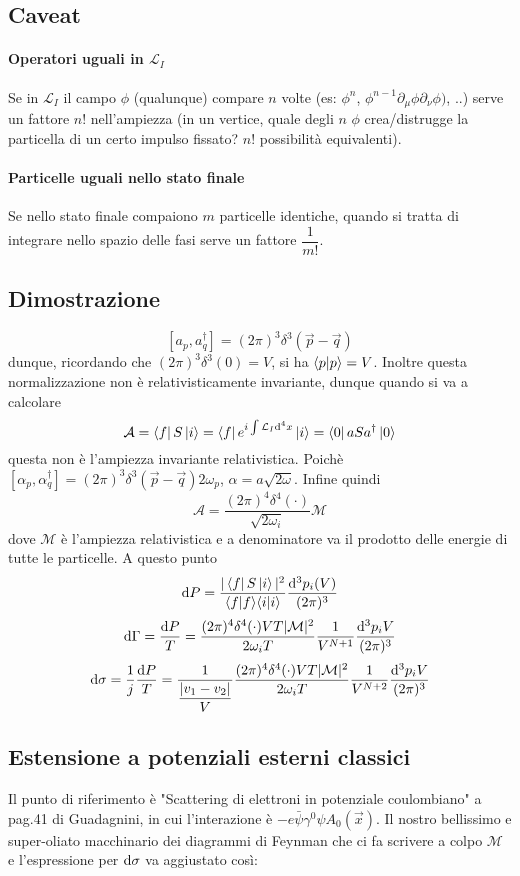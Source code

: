 \documentclass[12pt,a4paper]{article}
\begin{document}
	\subsection{Caveat}
	\paragraph{Operatori uguali in $\mathcal{L}_I$} Se in $\mathcal{L}_I$ il campo $\phi$ (qualunque) compare $n$ volte (es: $\phi^n$, $\phi^{n-1} \partial_\mu \phi \partial_\nu \phi)$, ..) serve un fattore $n!$ nell'ampiezza (in un vertice, quale degli $n$ $\phi$ crea/distrugge la particella di un certo impulso fissato? $n!$ possibilità equivalenti).
	
	\paragraph{Particelle uguali nello stato finale} Se nello stato finale compaiono $m$ particelle identiche, quando si tratta di integrare nello spazio delle fasi serve un fattore $\dfrac{1}{m!}$.
	
	\subsection{Dimostrazione}
	\[ [a_p,a_q^\dagger] = (2\pi)^3 \delta^3(\vec{p}-\vec{q}) \]
	dunque, ricordando che $(2\pi)^3 \delta^3(0) = V$, si ha $\langle p\vert p\rangle = V$. Inoltre questa normalizzazione non è relativisticamente invariante, dunque quando si va a calcolare
	\[ \mathcal{A} = \left\langle f\right|S\left| i\right\rangle = \left\langle f\right|e^{i\int \mathcal{L}_I \mathrm{d}^4 x} \left| i\right\rangle = \left\langle 0\right|aSa^\dagger\left| 0\right\rangle \]
	questa non è l'ampiezza invariante relativistica. Poichè $[\alpha_p,\alpha_q^\dagger] = (2\pi)^3 \delta^3(\vec{p}-\vec{q}) 2\omega_p$, $\alpha = a \sqrt{2\omega}$. Infine quindi
	\[ \mathcal{A} = \dfrac{(2\pi)^4 \delta^4(\cdot)}{\sqrt{2\omega_i}} \mathcal{M} \]
	dove $\mathcal{M}$ è l'ampiezza relativistica e a denominatore va il prodotto delle energie di tutte le particelle. A questo punto
	\[ \mathrm{d} P = \dfrac{|\left\langle f\right|S\left| i\right\rangle|^2}{\langle f\vert f\rangle \langle i\vert i\rangle } \dfrac{\mathrm{d}^3 p_i(V)}{(2\pi)^3} \]
	\[ \mathrm{d} \Gamma = \dfrac{\mathrm{d} P}{T} = \dfrac{(2\pi)^4 \delta^4(\cdot) VT |\mathcal{M}|^2 }{2\omega_i T} \dfrac{1}{V^{N+1}} \dfrac{\mathrm{d}^3 p_i V}{(2\pi)^3} \]
	\[ \mathrm{d}\sigma = \dfrac{1}{j} \dfrac{\mathrm{d} P}{T} = \dfrac{1}{\dfrac{|v_1-v_2|}{V}} \dfrac{(2\pi)^4 \delta^4(\cdot) VT |\mathcal{M}|^2 }{2\omega_i T} \dfrac{1}{V^{N+2}} \dfrac{\mathrm{d}^3 p_i V}{(2\pi)^3} \]
	
	\subsection{Estensione a potenziali esterni classici}
	Il punto di riferimento è "Scattering di elettroni in potenziale coulombiano" a pag.41 di Guadagnini, in cui l'interazione è $-e\bar{\psi}\gamma^0\psi A_0(\vec{x})$. Il nostro bellissimo e super-oliato macchinario dei diagrammi di Feynman che ci fa scrivere a colpo $\mathcal{M}$ e l'espressione per $\mathrm{d} \sigma$ va aggiustato così:
	
\end{document}
